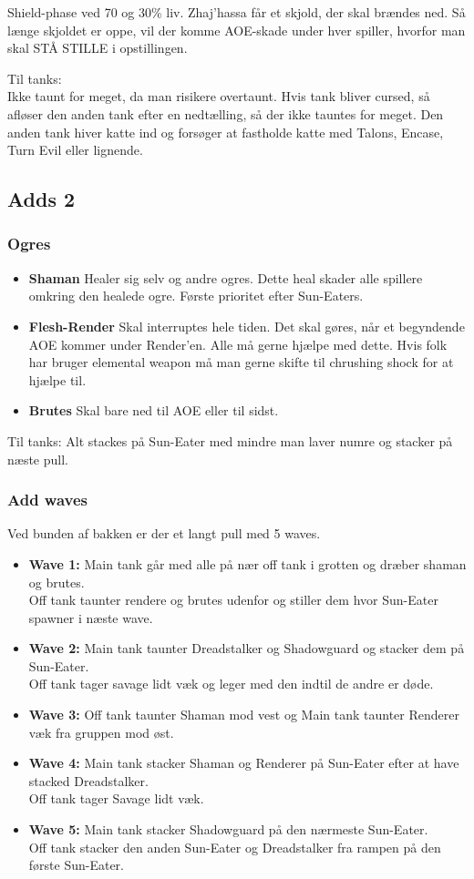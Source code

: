 Shield-phase ved 70 og 30\% liv. Zhaj'hassa får et skjold, der skal brændes
ned. Så længe skjoldet er oppe, vil der komme AOE-skade under hver spiller,
hvorfor man skal STÅ STILLE i opstillingen.

Til tanks:\\
Ikke taunt for meget, da man risikere overtaunt. Hvis tank bliver cursed, så
afløser den anden tank efter en nedtælling, så der ikke tauntes for meget.
Den anden tank hiver katte ind og forsøger at fastholde katte med Talons,
Encase, Turn Evil eller lignende.

\subsection*{Adds 2}
\subsubsection*{Ogres}
\begin{itemize}
	\item \textbf{Shaman} Healer sig selv og andre ogres. Dette heal skader
		alle spillere omkring den healede ogre. Første prioritet efter
		Sun-Eaters.
  \item \textbf{Flesh-Render} Skal interruptes hele tiden. Det skal gøres, når
    et begyndende AOE kommer under Render'en. Alle må gerne
		hjælpe med dette. Hvis folk har bruger elemental weapon må man
		gerne skifte til chrushing shock for at hjælpe til.
	\item \textbf{Brutes} Skal bare ned til AOE eller til sidst.
\end{itemize}
Til tanks: Alt stackes på Sun-Eater med mindre man laver numre og stacker på
næste pull. 

\subsubsection*{Add waves}
Ved bunden af bakken er der et langt pull med 5 waves. 
\begin{itemize}
	\item \textbf{Wave 1:} Main tank går med alle på nær off tank i grotten
		og dræber shaman og brutes. \\
		Off tank taunter rendere og brutes udenfor og stiller dem hvor
		Sun-Eater spawner i næste wave.
	\item \textbf{Wave 2:} Main tank taunter Dreadstalker og Shadowguard og
		stacker dem på Sun-Eater.\\
		Off tank tager savage lidt væk og leger med den indtil de andre
		er døde.
	\item \textbf{Wave 3:} Off tank taunter Shaman mod vest og Main tank taunter
		Renderer væk fra gruppen mod øst.
	\item \textbf{Wave 4:} Main tank stacker Shaman og Renderer på Sun-Eater
    efter at have stacked Dreadstalker.\\
    Off tank tager Savage lidt væk.
  \item \textbf{Wave 5:} Main tank stacker Shadowguard på den nærmeste
    Sun-Eater.\\
    Off tank stacker den anden Sun-Eater og Dreadstalker fra rampen på den første
    Sun-Eater.
\end{itemize}


